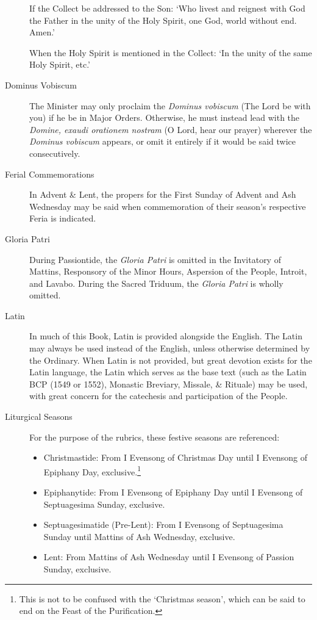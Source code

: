 \begin{description}
If the Collect be addressed to the Son: `Who livest and reignest with God the Father in the unity of the Holy Spirit, one God, world without end. Amen.'\par
When the Holy Spirit is mentioned in the Collect: `In the unity of the same Holy Spirit, etc.'
\item[Dominus Vobiscum] The Minister may only proclaim the \emph{Dominus vobiscum} (The Lord be with you) if he be in Major Orders. Otherwise, he must instead lead with the \emph{Domine, exaudi orationem nostram} (O Lord, hear our prayer) wherever the \emph{Dominus vobiscum} appears, or omit it entirely if it would be said twice consecutively.
\item[Ferial Commemorations] In Advent \& Lent, the propers for the First Sunday of Advent and Ash Wednesday may be said when commemoration of their season's respective Feria is indicated.
\item[Gloria Patri] During Passiontide, the \emph{Gloria Patri} is omitted in the Invitatory of Mattins, Responsory of the Minor Hours, Aspersion of the People, Introit, and Lavabo. During the Sacred Triduum, the \emph{Gloria Patri} is wholly omitted.
\item[Latin] In much of this Book, Latin is provided alongside the English. The Latin may always be used instead of the English, unless otherwise determined by the Ordinary. When Latin is not provided, but great devotion exists for the Latin language, the Latin which serves as the base text (such as the Latin BCP (1549 or 1552), Monastic Breviary, Missale, \& Rituale) may be used, with great concern for the catechesis and participation of the People.
\item[Liturgical Seasons] For the purpose of the rubrics, these festive seasons are referenced:
    \begin{itemize}
        \item Christmastide: From I Evensong of Christmas Day until I Evensong of Epiphany Day, exclusive.\footnote{This is not to be confused with the `Christmas season', which can be said to end on the Feast of the Purification.}
        \item Epiphanytide: From I Evensong of Epiphany Day until I Evensong of Septuagesima Sunday, exclusive.
        \item Septuagesimatide (Pre-Lent): From I Evensong of Septuagesima Sunday until Mattins of Ash Wednesday, exclusive.
        \item Lent: From Mattins of Ash Wednesday until I Evensong of Passion Sunday, exclusive.

\end{itemize}
\end{description}
